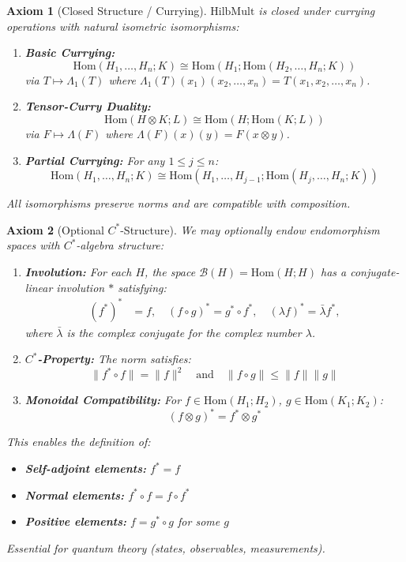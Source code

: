 \documentclass[11pt]{article}
\newtheorem{axiom}{Axiom}
\begin{document}
\begin{axiom}[Closed Structure / Currying]\label{ax:H6}
$\mathrm{HilbMult}$ is closed under currying operations with natural isometric isomorphisms:

\begin{enumerate}[label=(\alph*)]
    \item \textbf{Basic Currying:}
    \[
    \mathrm{Hom}(H_1, \dots, H_n; K) \cong \mathrm{Hom}(H_1; \mathrm{Hom}(H_2, \dots, H_n; K))
    \]
    via $T \mapsto \Lambda_1(T)$ where $\Lambda_1(T)(x_1)(x_2, \dots, x_n) = T(x_1, x_2, \dots, x_n)$.
    
    \item \textbf{Tensor-Curry Duality:}
    \[
    \mathrm{Hom}(H \otimes K; L) \cong \mathrm{Hom}(H; \mathrm{Hom}(K; L))
    \]
    via $F \mapsto \Lambda(F)$ where $\Lambda(F)(x)(y) = F(x \otimes y)$.
    
    \item \textbf{Partial Currying:} For any $1 \le j \le n$:
    \[
    \mathrm{Hom}(H_1, \dots, H_n; K) \cong \mathrm{Hom}(H_1, \dots, H_{j-1}; \mathrm{Hom}(H_j, \dots, H_n; K))
    \]
\end{enumerate}
All isomorphisms preserve norms and are compatible with composition.
\end{axiom}

\begin{axiom}[Optional $C^*$-Structure]\label{ax:H7}
We may optionally endow endomorphism spaces with $C^*$-algebra structure:

\begin{enumerate}[label=(\alph*)]
    \item \textbf{Involution:} For each $H$, the space $\mathcal{B}(H) = \mathrm{Hom}(H;H)$ has a conjugate-linear involution $*$ satisfying:
    \begin{align*}
        (f^*)^* &= f, \quad (f \circ g)^* = g^* \circ f^*, \quad (\lambda f)^* = \bar{\lambda} f^*,
    \end{align*}
    where $\bar{\lambda}$ is the complex conjugate for the complex number $\lambda$.
    
    \item \textbf{$C^*$-Property:} The norm satisfies:
    \[
    \|f^* \circ f\| = \|f\|^2 \quad \text{and} \quad \|f \circ g\| \le \|f\|\|g\|
    \]
    
    \item \textbf{Monoidal Compatibility:} For $f \in \mathrm{Hom}(H_1; H_2)$, $g \in \mathrm{Hom}(K_1; K_2)$:
    \[
    (f \otimes g)^* = f^* \otimes g^*
    \]
\end{enumerate}

This enables the definition of:
\begin{itemize}
    \item \textbf{Self-adjoint elements:} $f^* = f$
    \item \textbf{Normal elements:} $f^* \circ f = f \circ f^*$  
    \item \textbf{Positive elements:} $f = g^* \circ g$ for some $g$
\end{itemize}
Essential for quantum theory (states, observables, measurements).
\end{axiom}
\end{document}
